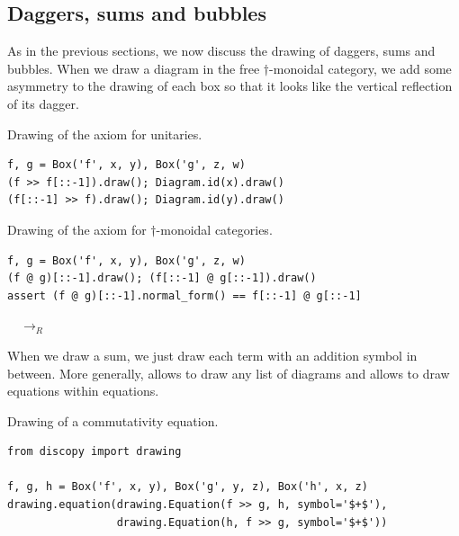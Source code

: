 \subsection{Daggers, sums and bubbles}

As in the previous sections, we now discuss the drawing of daggers, sums and bubbles.
When we draw a diagram in the free $\dagger$-monoidal category, we add some asymmetry to the drawing of each box so that it looks like the vertical reflection of its dagger.

\begin{example}
{\normalfont Drawing of the axiom for unitaries.}

\begin{verbatim}
f, g = Box('f', x, y), Box('g', z, w)
(f >> f[::-1]).draw(); Diagram.id(x).draw()
(f[::-1] >> f).draw(); Diagram.id(y).draw()
\end{verbatim}

\begin{center}
 \hspace{100pt}
\end{center}
\end{example}

\begin{example}
{\normalfont Drawing of the axiom for $\dagger$-monoidal categories.}

\begin{verbatim}
f, g = Box('f', x, y), Box('g', z, w)
(f @ g)[::-1].draw(); (f[::-1] @ g[::-1]).draw()
assert (f @ g)[::-1].normal_form() == f[::-1] @ g[::-1]
\end{verbatim}

\begin{center}
$\quad \to_R \quad$ 
\end{center}
\end{example}

When we draw a sum, we just draw each term with an addition symbol in between.
More generally,  allows to draw any list of diagrams and  allows to draw equations within equations.

\begin{example}
{\normalfont Drawing of a commutativity equation.}

\begin{verbatim}
from discopy import drawing

f, g, h = Box('f', x, y), Box('g', y, z), Box('h', x, z)
drawing.equation(drawing.Equation(f >> g, h, symbol='$+$'),
                 drawing.Equation(h, f >> g, symbol='$+$'))
\end{verbatim}
\end{example}


